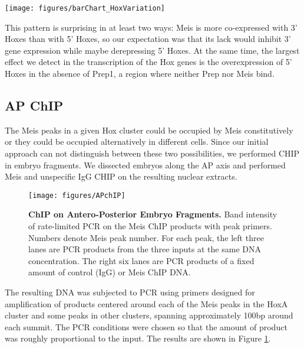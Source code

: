 \begin{SCfigure}[]
  \centering
  \texttt{[image: figures/barChart\_HoxVariation]}
  \caption[Differential transcriptional response of the 3' and 5' halves of the Hox clusters]{\textbf{Differential transcriptional response of the 3' and 5' halves of the Hox clusters.} Meis \ac{KO} (red) or \ac{prepi} (blue) Hox transcripts abundance relative to \ac{WT} littermate controls, as percentages.}
  \label{fig:HoxTranscript}
\end{SCfigure}


This pattern is surprising in at least two ways: Meis is more co-expressed with 3' Hoxes than with 5' Hoxes, so our expectation was that its lack would inhibit 3' gene expression while maybe derepressing 5' Hoxes. At the same time, the largest effect we detect in the transcription of the Hox genes is the overexpression of 5' Hoxes in the absence of Prep1, a region where neither Prep nor Meis bind.

\subsection{AP ChIP}

The Meis peaks in a given Hox cluster could be occupied by Meis constitutively or they could be occupied alternatively in different cells. Since our initial approach can not distinguish between these two possibilities, we performed \ac{CHIP} in embryo fragments. We dissected embryos along the \ac{AP} axis and performed Meis and unspecific IgG \ac{CHIP} on the resulting nuclear extracts.

\begin{figure}[p]
  \centering
  \texttt{[image: figures/APchIP]}
  \caption[ChIP on Antero-Posterior Embryo Fragments]{\textbf{ChIP on Antero-Posterior Embryo Fragments.} Band intensity of rate-limited PCR on the Meis ChIP products with peak primers. Numbers denote Meis peak number. For each peak, the left three lanes are PCR products from the three inputs at the same DNA concentration. The right six lanes are PCR products of a fixed amount of control (IgG) or Meis ChIP DNA.}
  \label{fig:APchip}
\end{figure}

The resulting DNA was subjected to \ac{PCR} using primers designed for amplification of products centered around each of the Meis peaks in the HoxA cluster and some peaks in other clusters, spanning approximately 100bp around each summit. The PCR conditions were chosen so that the amount of product was roughly proportional to the input. The results are shown in Figure \ref{fig:APchip}. 

